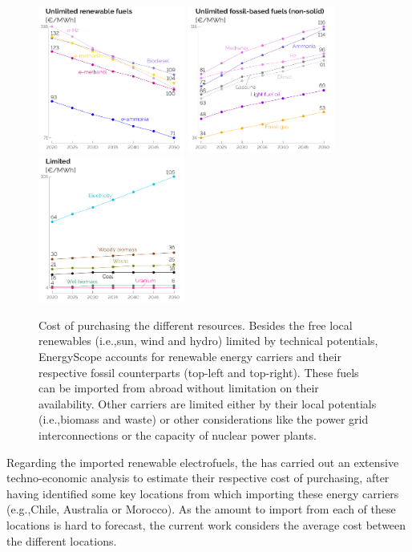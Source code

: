 \documentclass[11pt,twoside,a4paper,english]{article}
\def\eg{e.g.,}
\def\ie{i.e.,}
\begin{document}
\begin{appendices}
\begin{figure}[htbp!]
\centering
\includegraphics[width=0.43\textwidth]{Res_ren.pdf}
\includegraphics[width=0.43\textwidth]{Res_foss.pdf}
\includegraphics[width=0.43\textwidth]{Res_others.pdf}
\caption{Cost of purchasing the different resources. Besides the free local renewables (\ie sun, wind and hydro) limited by technical potentials, EnergyScope accounts for renewable energy carriers and their respective fossil counterparts (top-left and top-right). These fuels can be imported from abroad without limitation on their availability. Other carriers are limited either by their local potentials (\ie biomass and waste) or other considerations like the power grid interconnections or the capacity of nuclear power plants.}
\label{fig:cs_resources_cost}
\end{figure}

Regarding the imported renewable electrofuels, the \citet{h2coalition} has carried out an extensive techno-economic analysis to estimate their respective cost of purchasing, after having identified some key locations from which importing these energy carriers (\eg Chile, Australia or Morocco). As the amount to import from each of these locations is hard to forecast, the current work considers the average cost between the different locations. 


\end{appendices}
\end{document}
